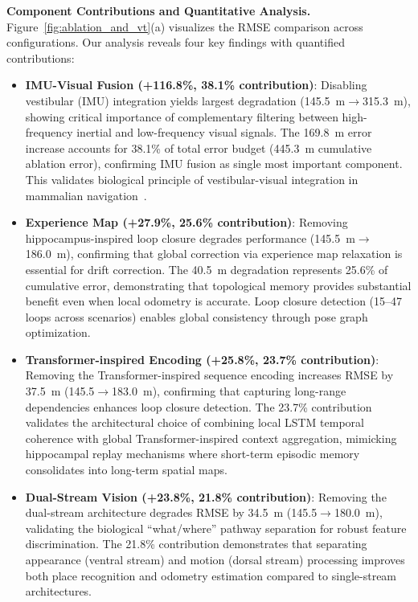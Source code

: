 \textbf{Component Contributions and Quantitative Analysis.} Figure~\ref{fig:ablation_and_vt}(a) visualizes the RMSE comparison across configurations. Our analysis reveals four key findings with quantified contributions:

\begin{itemize}
    \item \textbf{IMU-Visual Fusion (+116.8\%, 38.1\% con\-tri\-bu\-tion)}: Disabling ves\-tib\-u\-lar (IMU) integration yields largest deg\-ra\-da\-tion (145.5~m$\rightarrow$315.3~m), showing critical importance of comple\-mentary filtering between high-frequency inertial and low-frequency visual signals. The 169.8~m error increase accounts for 38.1\% of total error budget (445.3~m cumulative ablation error), confirming IMU fusion as single most important component. This validates biological principle of ves\-tib\-u\-lar-visual integration in mammalian navigation~\cite{Angelaki2008}.

    \item \textbf{Experience Map (+27.9\%, 25.6\% con\-tri\-bu\-tion)}: Removing hippo\-campus-inspired loop closure de\-grades per\-for\-mance (145.5~m$\rightarrow$186.0~m), confirming that global correction via experience map relaxation is essential for drift correction. The 40.5~m deg\-ra\-da\-tion represents 25.6\% of cumulative error, demonstrating that topological memory provides substantial benefit even when local odometry is accurate. Loop closure detection (15--47 loops across scenarios) enables global consistency through pose graph optimization.

    \item \textbf{Trans\-form\-er-in\-spired Encoding (+25.8\%, 23.7\% con\-tri\-bu\-tion)}: Removing the Trans\-former-inspired sequence encoding increases RMSE by 37.5~m (145.5$\rightarrow$183.0~m), confirming that capturing long-range depen\-dencies enhances loop closure detection. The 23.7\% con\-tri\-bu\-tion validates the archi\-tectural choice of combining local LSTM temporal coherence with global Trans\-form\-er-in\-spired context aggregation, mimicking hippo\-campal replay mechanisms where short-term episodic memory consolidates into long-term spatial maps.

    \item \textbf{Dual-Stream Vision (+23.8\%, 21.8\% con\-tri\-bu\-tion)}: Removing the dual-stream archi\-tecture de\-grades RMSE by 34.5~m (145.5$\rightarrow$180.0~m), validating the biological ``what/where'' pathway separation for robust feature discrim\-ination. The 21.8\% con\-tri\-bu\-tion demon\-strates that separating appearance (ventral stream) and motion (dorsal stream) processing improves both place recognition and odometry estimation compared to single-stream architectures.
\end{itemize}

